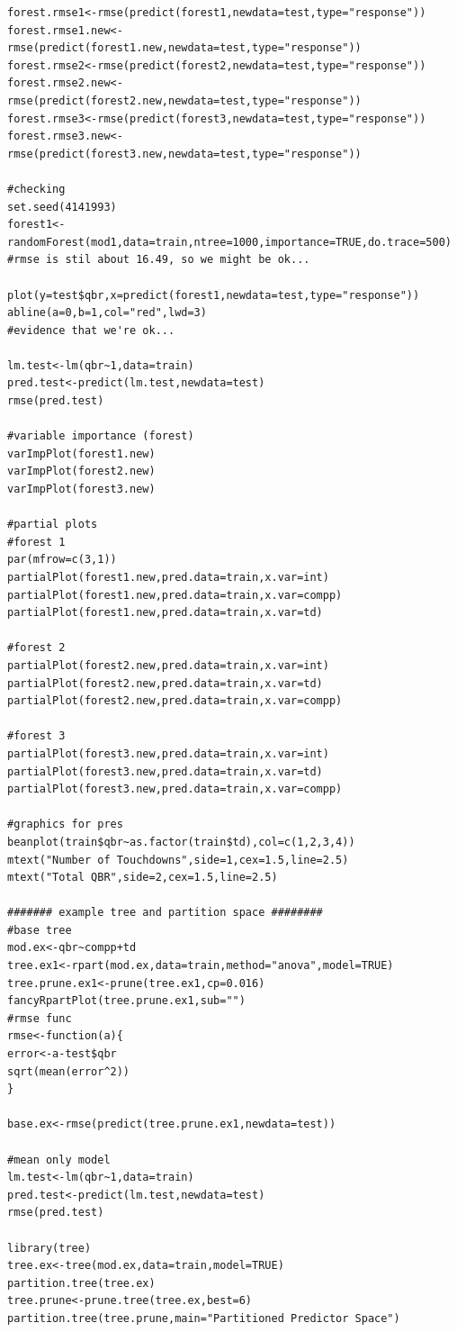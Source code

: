 \documentclass[12pt]{article}\usepackage[]{graphicx}\usepackage[]{color}
\begin{document}
\begin{lstlisting}
forest.rmse1<-rmse(predict(forest1,newdata=test,type="response"))
forest.rmse1.new<-rmse(predict(forest1.new,newdata=test,type="response"))
forest.rmse2<-rmse(predict(forest2,newdata=test,type="response"))
forest.rmse2.new<-rmse(predict(forest2.new,newdata=test,type="response"))
forest.rmse3<-rmse(predict(forest3,newdata=test,type="response"))
forest.rmse3.new<-rmse(predict(forest3.new,newdata=test,type="response"))

#checking
set.seed(4141993)
forest1<-randomForest(mod1,data=train,ntree=1000,importance=TRUE,do.trace=500)
#rmse is stil about 16.49, so we might be ok...

plot(y=test$qbr,x=predict(forest1,newdata=test,type="response"))
abline(a=0,b=1,col="red",lwd=3)
#evidence that we're ok...

lm.test<-lm(qbr~1,data=train)
pred.test<-predict(lm.test,newdata=test)
rmse(pred.test)

#variable importance (forest)
varImpPlot(forest1.new)
varImpPlot(forest2.new)
varImpPlot(forest3.new)

#partial plots
#forest 1
par(mfrow=c(3,1))
partialPlot(forest1.new,pred.data=train,x.var=int)
partialPlot(forest1.new,pred.data=train,x.var=compp)
partialPlot(forest1.new,pred.data=train,x.var=td)

#forest 2
partialPlot(forest2.new,pred.data=train,x.var=int)
partialPlot(forest2.new,pred.data=train,x.var=td)
partialPlot(forest2.new,pred.data=train,x.var=compp)

#forest 3
partialPlot(forest3.new,pred.data=train,x.var=int)
partialPlot(forest3.new,pred.data=train,x.var=td)
partialPlot(forest3.new,pred.data=train,x.var=compp)

#graphics for pres
beanplot(train$qbr~as.factor(train$td),col=c(1,2,3,4))
mtext("Number of Touchdowns",side=1,cex=1.5,line=2.5)
mtext("Total QBR",side=2,cex=1.5,line=2.5)

####### example tree and partition space ########
#base tree
mod.ex<-qbr~compp+td
tree.ex1<-rpart(mod.ex,data=train,method="anova",model=TRUE)
tree.prune.ex1<-prune(tree.ex1,cp=0.016)
fancyRpartPlot(tree.prune.ex1,sub="")
#rmse func
rmse<-function(a){
error<-a-test$qbr
sqrt(mean(error^2))
}

base.ex<-rmse(predict(tree.prune.ex1,newdata=test))

#mean only model
lm.test<-lm(qbr~1,data=train)
pred.test<-predict(lm.test,newdata=test)
rmse(pred.test)

library(tree)
tree.ex<-tree(mod.ex,data=train,model=TRUE)
partition.tree(tree.ex)
tree.prune<-prune.tree(tree.ex,best=6)
partition.tree(tree.prune,main="Partitioned Predictor Space")


\end{lstlisting}
\end{document}
